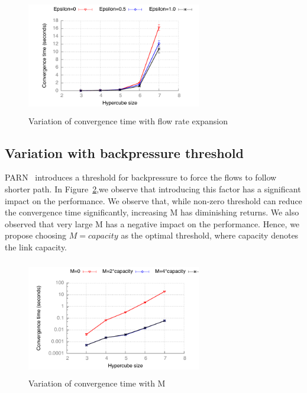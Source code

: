 \begin{figure}
\centering
\includegraphics[width=3in, height=2in]{./figures/epsilon.pdf}
\caption{\small Variation of convergence time with flow rate expansion}
\label{fig:epsilon}
\end{figure}


\subsection{Variation with backpressure threshold}
PARN~\cite{Srikant3} introduces a threshold for backpressure to force the flows to follow shorter path. In Figure~\ref{fig:M_1},we observe that introducing this factor has a significant impact on the performance. We observe that, while non-zero threshold can reduce the convergence time significantly, increasing M has diminishing returns. We also observed that very large M has a negative impact on the performance. Hence, we propose choosing $M=capacity$ as the optimal threshold, where capacity denotes the link capacity.

 
\begin{figure}
\centering
\includegraphics[width=3in, height=2in]{./figures/M_variation.pdf}
\caption{\small Variation of convergence time with M}
\label{fig:M_1}
\end{figure}



